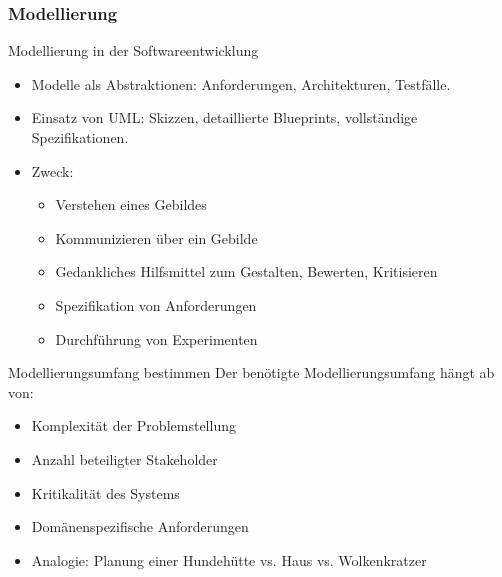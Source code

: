 \subsubsection{Modellierung}

\begin{definition}{Modellierung in der Softwareentwicklung}
\begin{itemize}
    \item Modelle als Abstraktionen: Anforderungen, Architekturen, Testfälle.
    \item Einsatz von UML: Skizzen, detaillierte Blueprints, vollständige Spezifikationen.
    \item Zweck:
    \begin{itemize}
        \item Verstehen eines Gebildes
        \item Kommunizieren über ein Gebilde
        \item Gedankliches Hilfsmittel zum Gestalten, Bewerten, Kritisieren
        \item Spezifikation von Anforderungen
        \item Durchführung von Experimenten
    \end{itemize}
\end{itemize}
\end{definition}


\begin{KR}{Modellierungsumfang bestimmen}
Der benötigte Modellierungsumfang hängt ab von:
\begin{itemize}
    \item Komplexität der Problemstellung
    \item Anzahl beteiligter Stakeholder
    \item Kritikalität des Systems
    \item Domänenspezifische Anforderungen
    \item Analogie: Planung einer Hundehütte vs. Haus vs. Wolkenkratzer
\end{itemize}
\end{KR}

